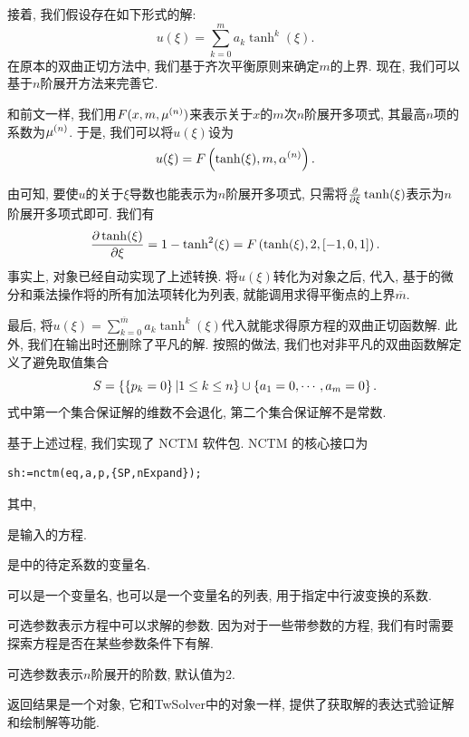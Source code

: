 接着, 我们假设存在如下形式的解:
\begin{equation}
    u(\xi)=\sum_{k=0}^m{a_k \tanh^k(\xi)}. \label{tanh-poly}
\end{equation}
在原本的双曲正切方法中, 我们基于齐次平衡原则来确定$m$的上界. 现在, 我们可以基于$n$阶展开方法来完善它. 

和前文一样, 我们用$F(x,m,\mu^{(n)})$来表示关于$x$的$m$次$n$阶展开多项式, 其最高$n$项的系数为$\mu^{(n)}$. 于是, 我们可以将$u(\xi)$设为
\begin{equation}
    u(\xi)=F\left(\tanh(\xi),m,\alpha^{(n)}\right).
\end{equation}

由可知, 要使$u$的关于$\xi$导数也能表示为$n$阶展开多项式, 只需将$\frac{\partial}{\partial \xi}\tanh(\xi)$表示为$n$阶展开多项式即可. 我们有 
\begin{equation}
    \frac{\partial \tanh(\xi)}{\partial \xi}=1-\tanh^2(\xi)=F\left(\tanh(\xi),2,[-1,0,1]\right).
\end{equation}
事实上, 对象已经自动实现了上述转换. 将$u(\xi)$转化为对象之后, 代入, 基于的微分和乘法操作将的所有加法项转化为列表, 就能调用求得平衡点的上界$\overline{m}$.

最后, 将$u(\xi)=\sum_{k=0}^{\overline{m}}{a_k \tanh^k(\xi)}$代入就能求得原方程的双曲正切函数解.  此外, 我们在输出时还删除了平凡的解. 按照的做法, 我们也对非平凡的双曲函数解定义了避免取值集合
\begin{equation}
    S=\left\{\left\{p_k=0\right\}|1\le k \le n\right\} \cup \left\{a_1=0,\cdots,a_m=0\right\}.
\end{equation}
式中第一个集合保证解的维数不会退化, 第二个集合保证解不是常数. 

基于上述过程, 我们实现了 NCTM 软件包. NCTM 的核心接口为
\begin{verbatim}
sh:=nctm(eq,a,p,{SP,nExpand});
\end{verbatim}
其中,
\begin{compactitem}[\textbullet]
\item {} 是输入的方程.
\item {} 是中的待定系数的变量名.
\item {} 可以是一个变量名, 也可以是一个变量名的列表, 用于指定中行波变换的系数.
\item 可选参数表示方程中可以求解的参数. 因为对于一些带参数的方程, 我们有时需要探索方程是否在某些参数条件下有解.
\item 可选参数表示$n$阶展开的阶数, 默认值为2.
\item 返回结果是一个对象, 它和TwSolver中的对象一样, 提供了获取解的表达式\D 验证解和绘制解等功能. 
\end{compactitem}

